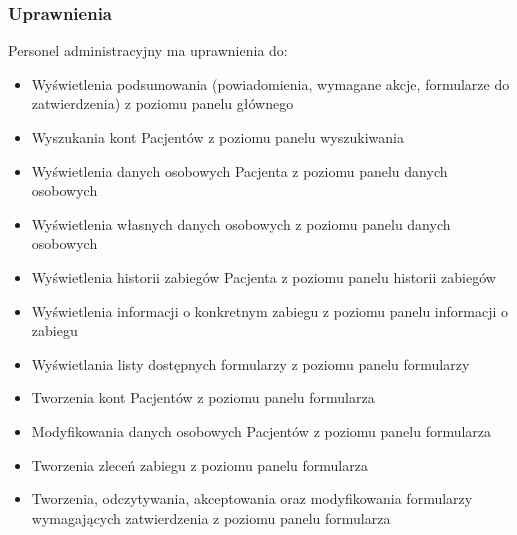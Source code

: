 \subsubsection{Uprawnienia}
Personel administracyjny ma uprawnienia do:\begin{itemize}
    \item Wyświetlenia podsumowania (powiadomienia, wymagane akcje, formularze do zatwierdzenia) z poziomu panelu głównego
    \item Wyszukania kont Pacjentów z poziomu panelu wyszukiwania
    \item Wyświetlenia danych osobowych Pacjenta z poziomu panelu danych osobowych
    \item Wyświetlenia własnych danych osobowych z poziomu panelu danych osobowych
    \item Wyświetlenia historii zabiegów Pacjenta z poziomu panelu historii zabiegów
    \item Wyświetlenia informacji o konkretnym zabiegu z poziomu panelu informacji o zabiegu
    \item Wyświetlania listy dostępnych formularzy z poziomu panelu formularzy
    \item Tworzenia kont Pacjentów z poziomu panelu formularza
    \item Modyfikowania danych osobowych Pacjentów z poziomu panelu formularza
    \item Tworzenia zleceń zabiegu z poziomu panelu formularza
    \item Tworzenia, odczytywania, akceptowania oraz modyfikowania formularzy wymagających zatwierdzenia z poziomu panelu formularza
\end{itemize}

